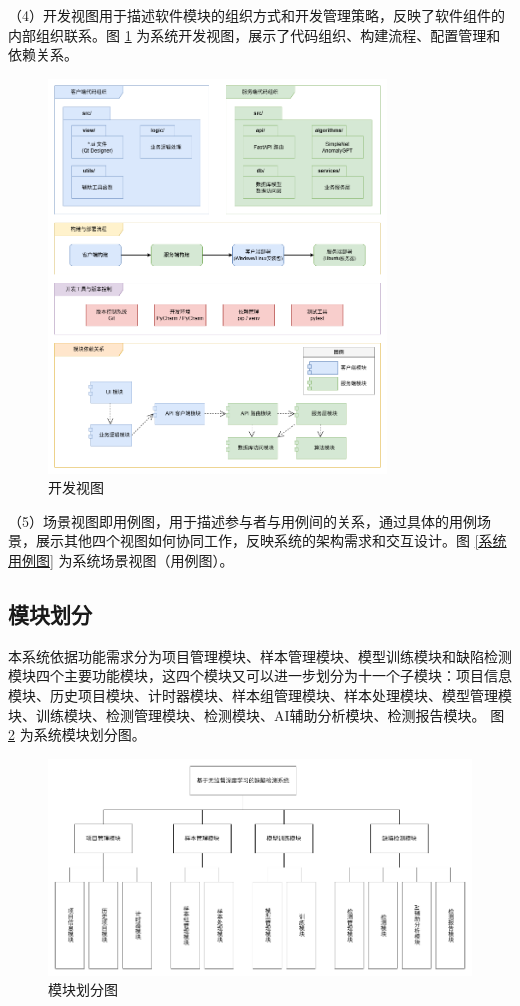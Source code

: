 \documentclass[
  ]{njuthesis}
\begin{document}
（4）开发视图用于描述软件模块的组织方式和开发管理策略，反映了软件组件的内部组织联系。图 \ref{开发视图} 为系统开发视图，展示了代码组织、构建流程、配置管理和依赖关系。

\begin{figure}[H]
    \centering
    \includegraphics[width=0.8\textwidth]{images/开发视图.png}
    \caption{开发视图}
    \label{开发视图}
\end{figure}

（5）场景视图即用例图，用于描述参与者与用例间的关系，通过具体的用例场景，展示其他四个视图如何协同工作，反映系统的架构需求和交互设计。图 \ref{系统用例图} 为系统场景视图（用例图）。

\subsection{模块划分}

本系统依据功能需求分为项目管理模块、样本管理模块、模型训练模块和缺陷检测模块四个主要功能模块，这四个模块又可以进一步划分为十一个子模块：项目信息模块、历史项目模块、计时器模块、样本组管理模块、样本处理模块、模型管理模块、训练模块、检测管理模块、检测模块、AI辅助分析模块、检测报告模块。
图 \ref{模块划分图} 为系统模块划分图。

\begin{figure}[htb]
    \centering
    \includegraphics[width=\textwidth]{images/模块划分图.png}
    \caption{模块划分图}
    \label{模块划分图}
\end{figure}
\end{document}

